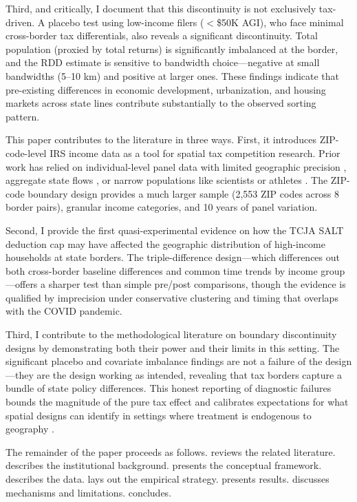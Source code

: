 \documentclass[12pt]{article}
\begin{document}
Third, and critically, I document that this discontinuity is not exclusively tax-driven. A placebo test using low-income filers ($<$\$50K AGI), who face minimal cross-border tax differentials, also reveals a significant discontinuity. Total population (proxied by total returns) is significantly imbalanced at the border, and the RDD estimate is sensitive to bandwidth choice---negative at small bandwidths (5--10 km) and positive at larger ones. These findings indicate that pre-existing differences in economic development, urbanization, and housing markets across state lines contribute substantially to the observed sorting pattern.

This paper contributes to the literature in three ways. First, it introduces ZIP-code-level IRS income data as a tool for spatial tax competition research. Prior work has relied on individual-level panel data with limited geographic precision \citep{young2016millionaire, kleven2014migration}, aggregate state flows \citep{cohen2011interstate}, or narrow populations like scientists \citep{moretti2017effect} or athletes \citep{kleven2013taxation}. The ZIP-code boundary design provides a much larger sample (2,553 ZIP codes across 8 border pairs), granular income categories, and 10 years of panel variation.

Second, I provide the first quasi-experimental evidence on how the TCJA SALT deduction cap may have affected the geographic distribution of high-income households at state borders. The triple-difference design---which differences out both cross-border baseline differences and common time trends by income group---offers a sharper test than simple pre/post comparisons, though the evidence is qualified by imprecision under conservative clustering and timing that overlaps with the COVID pandemic.

Third, I contribute to the methodological literature on boundary discontinuity designs by demonstrating both their power and their limits in this setting. The significant placebo and covariate imbalance findings are not a failure of the design---they are the design working as intended, revealing that tax borders capture a bundle of state policy differences. This honest reporting of diagnostic failures bounds the magnitude of the pure tax effect and calibrates expectations for what spatial designs can identify in settings where treatment is endogenous to geography \citep{keele2015geographic}.

The remainder of the paper proceeds as follows.  reviews the related literature.  describes the institutional background.  presents the conceptual framework.  describes the data.  lays out the empirical strategy.  presents results.  discusses mechanisms and limitations.  concludes.
\end{document}
